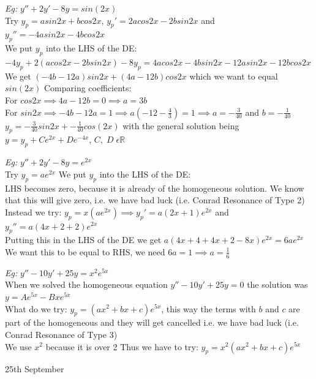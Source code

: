 \documentclass[11pt]{article}
\theoremstyle{definition}
\newcommand{\R}{\mathbb{R}}
\begin{document}
\textit{Eg:} $y'' + 2y' - 8y = sin(2x)$\\
Try $y_p = asin2x + bcos2x$, $y_p' = 2acos2x -2bsin2x$ and $y_p'' = -4asin2x - 4bcos2x$\\

We put $y_p$ into the LHS of the DE:\\
$-4y_p + 2(acos2x - 2bsin2x) -8y_p = 4acos2x - 4bsin2x -12asin2x - 12bcos2x$\\
We get $(-4b-12a)sin2x + (4a-12b)cos2x$ which we want to equal $sin(2x)$
Comparing coefficients:\\
For $cos2x \implies 4a-12b = 0 \implies a = 3b$\\
For $sin2x \implies -4b-12a = 1 \implies a(-12 - \frac{4}{3}) = 1 \implies a = -\frac{3}{40}$ and $b = -\frac{1}{40}$\\

$y_p = -\frac{3}{40}sin2x + -\frac{1}{40}cos(2x)$ with the general solution being $y = y_p + Ce^{2x} + De^{-4x}$, $C,\;D\;\epsilon \R$

\textit{Eg:} $y'' + 2y' - 8y = e^{2x}$\\
Try $y_p = ae^{2x}$
We put $y_p$ into the LHS of the DE:\\
LHS becomes zero, because it is already of the homogeneous solution.
We know that this will give zero, i.e. we have bad luck (i.e. Conrad Resonance of Type 2)\\
Instead we try:
$y_p = x(ae^{2x}) \implies y_p' = a(2x+1)e^{2x}$ and $y_p'' = a(4x+2+2)e^{2x}$\\
Putting this in the LHS of the DE we get $a(4x + 4 + 4x + 2 - 8x)e^{2x} = 6ae^{2x}$\\
We want this to be equal to RHS, we need $6a = 1 \implies a = \frac{1}{6}$



\textit{Eg:} $y'' - 10y' +25y = x^2e^{5x}$\\
When we solved the homogeneous equation $y'' - 10y' +25y = 0$ the solution was $y = Ae^{5x} - Bxe^{5x}$\\
What do we try: $y_p = (ax^2+bx+c)e^{5x}$, this way the terms with $b$ and $c$ are part of the homogeneous and they will get cancelled i.e. we have bad luck (i.e. Conrad Resonance of Type 3)\\
We use $x^2$ because it is over 2
Thus we have to try: $y_p = x^2(ax^2+bx+c)e^{5x}$

\newpage

\begin{center}
    {\LARGE 25th September}\\
\end{center}
\end{document}
